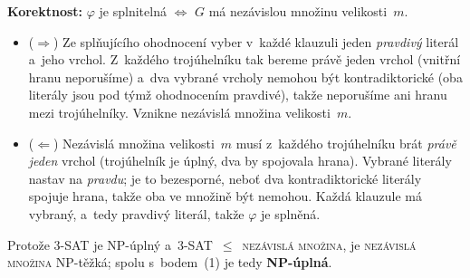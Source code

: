 \documentclass[11pt,a4paper]{article}
\begin{document}
\begin{priklad}
\textbf{Korektnost:} $\varphi$ je splnitelná $\Leftrightarrow$ $G$ má nezávislou množinu velikosti~$m$.
\begin{itemize}
  \item ($\Rightarrow$) Ze splňujícího ohodnocení vyber v~každé klauzuli jeden \emph{pravdivý} literál a~jeho vrchol. Z~každého trojúhelníku tak bereme právě jeden vrchol (vnitřní hranu neporušíme) a~dva vybrané vrcholy nemohou být kontradiktorické (oba literály jsou pod týmž ohodnocením pravdivé), takže neporušíme ani hranu mezi trojúhelníky. Vznikne nezávislá množina velikosti~$m$.
  \item ($\Leftarrow$) Nezávislá množina velikosti~$m$ musí z~každého trojúhelníku brát \emph{právě jeden} vrchol (trojúhelník je úplný, dva by spojovala hrana). Vybrané literály nastav na \emph{pravdu}; je to bezesporné, neboť dva kontradiktorické literály spojuje hrana, takže oba ve množině být nemohou. Každá klauzule má vybraný, a~tedy pravdivý literál, takže $\varphi$ je splněná.
\end{itemize}
Protože \textsc{3-SAT} je NP-úplný a~\textsc{3-SAT}~$\le$~\textsc{nezávislá množina}, je \textsc{nezávislá množina} NP-těžká; spolu s~bodem~(1) je tedy \textbf{NP-úplná}.
\end{priklad}
\end{document}

